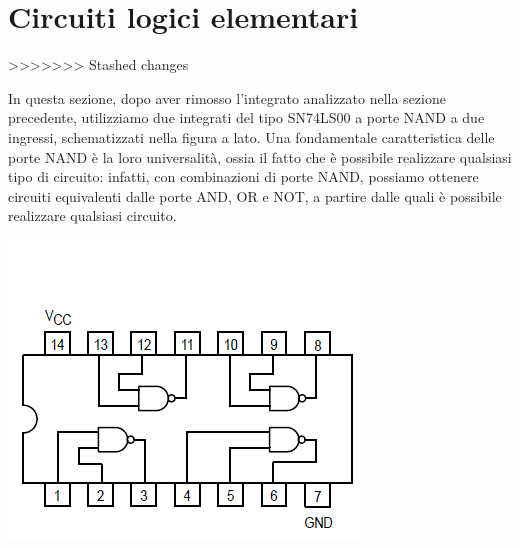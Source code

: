 \documentclass[10pt, a4paper, italian]{article}
\begin{document}
\section{Circuiti logici elementari}
>>>>>>> Stashed changes
\begin{minipage}{0.65\textwidth}
    In questa sezione, dopo aver rimosso l'integrato analizzato nella sezione precedente, utilizziamo due integrati del tipo SN74LS00 a porte NAND a due ingressi, schematizzati nella figura a lato. Una fondamentale caratteristica delle porte NAND è la loro universalità, ossia il fatto che è possibile realizzare qualsiasi tipo di circuito: infatti, con combinazioni di porte NAND, possiamo ottenere circuiti equivalenti dalle porte AND, OR e NOT, a partire dalle quali è possibile realizzare qualsiasi circuito.
\end{minipage}
\begin{minipage}{0.35\textwidth}
    \includegraphics[width=\textwidth]{NAND.png}
    \label{NAND}
\end{minipage}
\end{document}
